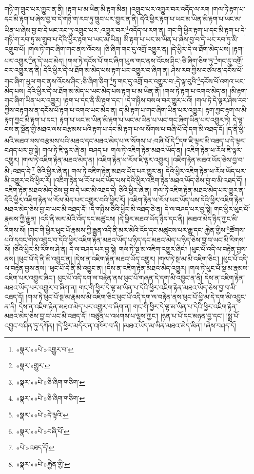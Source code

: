 གཉི་ག་གྲུབ་པར་གྱུར་ན་ནི། །རྟག་པ་མ་ཡིན་མི་རྟག་མིན། །འགྲུབ་པར་འགྱུར་བར་འདོད་ལ་རག །གལ་ཏེ་རྟག་པ་དང་མི་རྟག་པ་ཞེས་བྱ་བ་དེ་གཉི་ག་རབ་ཏུ་གྲུབ་པར་གྱུར་ན་ནི། དེའི་ཕྱིར་རྟག་པ་ཡང་མ་ཡིན་མི་རྟག་པ་ཡང་མ་ཡིན་པ་ཞེས་བྱ་བ་དེ་ཡང་རབ་ཏུ་འགྲུབ་པར་:འགྱུར་བར་\footnote{«སྣར་»«པེ་»འགྱུར་བ་}འདོད་ལ་རག་ན། གང་གི་ཕྱིར་རྟག་པ་དང་མི་རྟག་པ་དེ་གཉི་ག་རབ་ཏུ་མ་གྲུབ་པ་དེའི་ཕྱིར་རྟག་པ་ཡང་མ་ཡིན། མི་རྟག་པ་ཡང་མ་ཡིན་པ་ཞེས་བྱ་བ་དེ་ཡང་རབ་ཏུ་མི་འགྲུབ་པོ། །གལ་ཏེ་གང་ཞིག་གང་ནས་འོངས། །ཅི་ཞིག་གང་དུ་འགྲོ་འགྱུར་ན། །དེ་ཕྱིར་དེ་ལ་ཐོག་མེད་པས། །རྟག་པར་འགྱུར་\footnote{«སྣར་»གྱུར་}ན་དེ་ཡང་མེད། །གལ་ཏེ་དངོས་པོ་གང་ཞིག་ཡུལ་གང་ནས་འོངས་ཤིང་:ཅི་ཞིག་ཅིག་ཏུ་\footnote{«སྣར་»«པེ་»ཅི་ཞིག་གཅིག་}གང་དུ་འགྲོ་བར་འགྱུར་ན་ནི། དེའི་ཕྱིར་དེ་ལ་ཐོག་མ་མེད་པས་རྟག་པར་འགྱུར་བ་ཞིག་ན། ཤེས་རབ་ཀྱིས་བཙལ་ན་དངོས་པོ་གང་ཞིག་ཡུལ་གང་ནས་འོངས་ཤིང་:ཅི་ཞིག་ཅིག་\footnote{«སྣར་»«པེ་»ཅི་ཞིག་གཅིག་}ཏུ་གང་དུ་འགྲོ་བར་འགྱུར་བ་:དེ་ལྟ་བུའི་\footnote{«སྣར་»«པེ་»དེ་ལྟའི་}དངོས་པོ་འགའ་ཡང་མེད་པས། དེའི་ཕྱིར་དེ་ལ་ཐོག་མ་མེད་པ་ཡང་མེད་པས་རྟག་པ་མ་ཡིན་ནོ། །གལ་ཏེ་རྟག་པ་འགའ་མེད་ན། །མི་རྟག་གང་ཞིག་ཡིན་པར་འགྱུར། །རྟག་པ་དང་ནི་མི་རྟག་དང་། །དེ་གཉིས་བསལ་བར་གྱུར་པའོ། །གལ་ཏེ་དེ་ལྟར་ཤེས་རབ་ཀྱིས་བརྟགས་ན་དངོས་པོ་རྟག་པ་འགའ་ཡང་མེད་ན། ད་མི་རྟག་པ་གང་ཞིག་ཡིན་པར་འགྱུར། རྟག་ཀྱང་རྟག་ལ་མི་རྟག་ཀྱང་མི་རྟག་པ་དང་། རྟག་པ་ཡང་མ་ཡིན་མི་རྟག་པ་ཡང་མ་ཡིན་པ་ཡང་གང་ཞིག་ཡིན་པར་འགྱུར་ཏེ། དེ་ལྟ་བས་ན་སྔོན་གྱི་མཐའ་ལས་བརྩམས་པའི་རྟག་པ་དང་མི་རྟག་པ་ལ་སོགས་པ་བཞི་པོ་དེ་དག་མི་འཐད་དོ། །ད་ནི་ཕྱི་མའི་མཐའ་ལས་བརྩམས་པའི་མཐའ་དང་མཐའ་མེད་པ་ལ་སོགས་པ་:བཞི་པོ་དེ་\footnote{«སྣར་»«པེ་»བཞི་པོ་}དག་ཇི་ལྟར་མི་འཐད་པ་དེ་ལྟར་བཤད་པར་བྱ་སྟེ། གལ་ཏེ་ཇི་ལྟར་ཞེ་ན། བཤད་པ། གལ་ཏེ་འཇིག་རྟེན་མཐའ་ཡོད་ན། །འཇིག་རྟེན་ཕ་རོལ་ཇི་ལྟར་འགྱུར། །གལ་ཏེ་འཇིག་རྟེན་མཐའ་མེད་ན། །འཇིག་རྟེན་ཕ་རོལ་ཇི་ལྟར་འགྱུར། །འཇིག་རྟེན་མཐའ་ཡོད་ཅེས་བྱ་བ་མི་:འཐད་དེ།\footnote{«པེ་»འཐད་དོ།} ཅིའི་ཕྱིར་ཞེ་ན། གལ་ཏེ་འཇིག་རྟེན་མཐའ་ཡོད་པར་གྱུར་ན། དེའི་ཕྱིར་འཇིག་རྟེན་ཕ་རོལ་ཡོད་པར་མི་འགྱུར་བའི་ཕྱིར་རོ། །འཇིག་རྟེན་ཕ་རོལ་ཡང་ཡོད་པས་དེའི་ཕྱིར་འཇིག་རྟེན་མཐའ་ཡོད་ཅེས་བྱ་བ་མི་འཐད་དོ། །འཇིག་རྟེན་མཐའ་མེད་ཅེས་བྱ་བ་དེ་ཡང་མི་འཐད་དེ། ཅིའི་ཕྱིར་ཞེ་ན། གལ་ཏེ་འཇིག་རྟེན་མཐའ་མེད་པར་གྱུར་ན་དེའི་ཕྱིར་འཇིག་རྟེན་ཕ་རོལ་མེད་པར་འགྱུར་བའི་ཕྱིར་རོ། །འཇིག་རྟེན་ཕ་རོལ་ཡང་ཡོད་པས་དེའི་ཕྱིར་འཇིག་རྟེན་མཐའ་མེད་ཅེས་བྱ་བ་ཡང་མི་འཐད་དོ། །དེ་གཉིས་ཅིའི་ཕྱིར་མི་འཐད་ཅེ་ན། དེ་ལ་བཤད་པར་བྱ་སྟེ། གང་ཕྱིར་ཕུང་པོ་རྣམས་ཀྱི་རྒྱུན། །འདི་ནི་མར་མེའི་འོད་དང་མཚུངས། །དེ་ཕྱིར་མཐའ་ཡོད་ཉིད་དང་ནི། །མཐའ་མེད་ཉིད་ཀྱང་མི་རིགས་སོ། །གང་གི་ཕྱིར་ཕུང་པོ་རྣམས་ཀྱི་རྒྱུན་འདི་ནི་མར་མེའི་འོད་དང་མཚུངས་པར་རྒྱུ་དང་:རྐྱེན་གྱིས་\footnote{«སྣར་»«པེ་»རྐྱེན་གྱི་}ཚོགས་པའི་དབང་གིས་འབྱུང་བ་དེའི་ཕྱིར་འཇིག་རྟེན་མཐའ་ཡོད་པ་ཉིད་དང་མཐའ་མེད་པ་ཉིད་ཅེས་བྱ་བ་ཡང་མི་རིགས་སོ། །ཅིའི་ཕྱིར་མི་རིགས་ཤེ་ན། དེ་ལ་བཤད་པར་བྱ་སྟེ། གལ་ཏེ་སྔ་མ་འཇིག་འགྱུར་ཞིང་། །ཕུང་པོ་འདི་ལ་བརྟེན་བྱས་ནས། །ཕུང་པོ་དེ་ནི་མི་འབྱུང་ན། །དེས་ན་འཇིག་རྟེན་མཐའ་ཡོད་འགྱུར། །གལ་ཏེ་སྔ་མ་མི་འཇིག་ཅིང་། །ཕུང་པོ་འདི་ལ་བརྟེན་བྱས་ནས། །ཕུང་པོ་དེ་ནི་མི་འབྱུང་ན། །དེས་ན་འཇིག་རྟེན་མཐའ་མེད་འགྱུར། །གལ་ཏེ་ཕུང་པོ་སྔ་མ་རྣམས་འཇིག་པར་འགྱུར་ཞིང་། ཕུང་པོ་འདི་དག་ལ་བརྟེན་ནས་ཕུང་པོ་གཞན་དེ་དག་མི་འབྱུང་ན་ནི། དེས་ན་འཇིག་རྟེན་མཐའ་ཡོད་པར་འགྱུར་བ་ཞིག་ན། གང་གི་ཕྱིར་དེ་ལྟ་མ་ཡིན་པ་དེའི་ཕྱིར་འཇིག་རྟེན་མཐའ་ཡོད་ཅེས་བྱ་བ་མི་འཐད་དོ། །གལ་ཏེ་ཕུང་པོ་སྔ་མ་རྣམས་མི་འཇིག་ཅིང་ཕུང་པོ་འདི་དག་ལ་བརྟེན་ནས་ཕུང་པོ་ཕྱི་མ་དེ་དག་མི་འབྱུང་ན་ནི། དེས་ན་འཇིག་རྟེན་མཐའ་མེད་པར་འགྱུར་བ་ཞིག་ན། གང་གི་ཕྱིར་དེ་ལྟ་མ་ཡིན་པ་དེའི་ཕྱིར་འཇིག་རྟེན་མཐའ་མེད་ཅེས་བྱ་བ་ཡང་མི་འཐད་དོ། །བཙུན་པ་འཕགས་པ་ལྷས་ཀྱང་། །ཉན་པ་པོ་དང་མཉན་བྱ་དང་། །སྨྲ་པོ་འབྱུང་བ་ཤིན་ཏུ་དཀོན། །དེ་ཕྱིར་མདོར་ན་འཁོར་བ་ནི། །མཐའ་ཡོད་མ་ཡིན་མཐའ་མེད་མིན། །ཞེས་བཤད་དོ། 